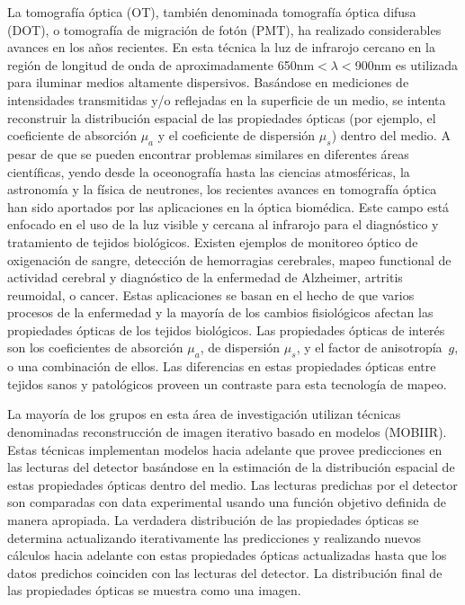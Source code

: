 \documentclass[a4paper,10pt]{article}
\begin{document}
La tomografía óptica (OT), también denominada tomografía óptica difusa 
(DOT), o tomografía de migración de fotón (PMT), ha realizado
considerables avances en los años recientes. En esta técnica la luz de
infrarojo cercano en la región de longitud de onda de aproximadamente
650nm$<\lambda<$900nm es utilizada para iluminar medios altamente
dispersivos. Basándose en mediciones de intensidades transmitidas y/o
reflejadas en la superficie de un medio, se intenta reconstruir la
distribución espacial de las propiedades ópticas (por ejemplo, el
coeficiente de absorción $\mu_a$ y el coeficiente de dispersión $\mu_s$)
dentro del medio. A pesar de que se pueden encontrar problemas 
similares en diferentes áreas científicas, yendo desde la oceonografía
hasta las ciencias atmosféricas, la astronomía y la física de neutrones,
los recientes avances en tomografía óptica han sido aportados por las
aplicaciones en la óptica biomédica. Este campo está enfocado en el uso 
de la luz visible y cercana al infrarojo para el diagnóstico y 
tratamiento de tejidos biológicos. Existen ejemplos de monitoreo óptico 
de oxigenación de sangre, detección de hemorragias cerebrales, mapeo
functional de actividad cerebral y diagnóstico de la enfermedad de
Alzheimer, artritis reumoidal, o cancer. Estas aplicaciones se basan en 
el hecho de que varios procesos de la enfermedad y la mayoría de los
cambios fisiológicos afectan las propiedades ópticas de los tejidos 
biológicos. Las propiedades ópticas de interés son los coeficientes de 
absorción $\mu_a$, de dispersión $\mu_s$, y el factor de 
anisotropía~$g$, o una combinación de ellos. Las diferencias en estas
propiedades ópticas entre tejidos sanos y patológicos proveen un 
contraste para esta tecnología de mapeo.

La mayoría de los grupos en esta área de investigación utilizan técnicas 
denominadas reconstrucción de imagen iterativo basado en modelos (MOBIIR).
Estas técnicas implementan modelos hacia adelante que provee predicciones
en las lecturas del detector basándose en la estimación de la distribución
espacial de estas propiedades ópticas dentro del medio. Las lecturas
predichas por el detector son comparadas con data experimental usando 
una función objetivo definida de manera apropiada. La verdadera
distribución de las propiedades ópticas se determina actualizando
iterativamente las predicciones y realizando nuevos cálculos hacia
adelante con estas propiedades ópticas actualizadas hasta que los datos
predichos coinciden con las lecturas del detector. La distribución final
de las propiedades ópticas se muestra como una imagen.
\end{document}
